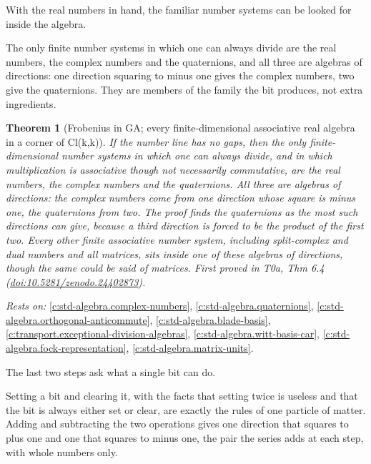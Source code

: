 \documentclass[11pt]{article}
\newtheorem{theorem}{Theorem}[section]
\theoremstyle{definition}
\theoremstyle{plain}
\begin{document}
With the real numbers in hand, the familiar number systems can be looked for inside the algebra.

The only finite number systems in which one can always divide are the real numbers, the complex numbers and the quaternions, and all three are algebras of directions: one direction squaring to minus one gives the complex numbers, two give the quaternions. They are members of the family the bit produces, not extra ingredients.

\begin{theorem}[Frobenius in GA; every finite-dimensional associative real algebra in a corner of Cl(k,k)]\label{c:synthesis.frobenius-and-universality-in-clifford-algebras}
If the number line has no gaps, then the only finite-dimensional number systems in which one can always divide, and in which multiplication is associative though not necessarily commutative, are the real numbers, the complex numbers and the quaternions. All three are algebras of directions: the complex numbers come from one direction whose square is minus one, the quaternions from two. The proof finds the quaternions as the most such directions can give, because a third direction is forced to be the product of the first two. Every other finite associative number system, including split-complex and dual numbers and all matrices, sits inside one of these algebras of directions, though the same could be said of matrices.
\emph{First proved in} T0a, Thm 6.4 (\href{https://doi.org/10.5281/zenodo.24402873}{doi:10.5281/zenodo.24402873}).
\end{theorem}
\noindent\emph{Rests on:} \ref{c:std-algebra.complex-numbers}, \ref{c:std-algebra.quaternions}, \ref{c:std-algebra.orthogonal-anticommute}, \ref{c:std-algebra.blade-basis}, \ref{c:transport.exceptional-division-algebras}, \ref{c:std-algebra.witt-basis-car}, \ref{c:std-algebra.fock-representation}, \ref{c:std-algebra.matrix-units}.

The last two steps ask what a single bit can do.

Setting a bit and clearing it, with the facts that setting twice is useless and that the bit is always either set or clear, are exactly the rules of one particle of matter. Adding and subtracting the two operations gives one direction that squares to plus one and one that squares to minus one, the pair the series adds at each step, with whole numbers only.
\end{document}
